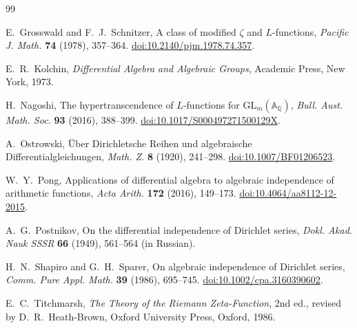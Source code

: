 \documentclass[11pt]{article}
\theoremstyle{definition}
\theoremstyle{remark}
\begin{document}
\begin{thebibliography}{99}

E.~Grosswald and F.~J.~Schnitzer,
\newblock A class of modified \(\zeta\) and \(L\)-functions,
\newblock \emph{Pacific J. Math.} \textbf{74} (1978), 357--364.
\newblock \href{https://doi.org/10.2140/pjm.1978.74.357}
{doi:10.2140/pjm.1978.74.357}.

E.~R.~Kolchin,
\newblock \emph{Differential Algebra and Algebraic Groups},
\newblock Academic Press, New York, 1973.

H.~Nagoshi,
\newblock The hypertranscendence of \(L\)-functions for
\(\mathrm{GL}_m(\mathbb A_{\mathbb Q})\),
\newblock \emph{Bull. Aust. Math. Soc.} \textbf{93} (2016), 388--399.
\newblock \href{https://doi.org/10.1017/S000497271500129X}
{doi:10.1017/S000497271500129X}.

A.~Ostrowski,
\newblock \"Uber Dirichletsche Reihen und algebraische Differentialgleichungen,
\newblock \emph{Math. Z.} \textbf{8} (1920), 241--298.
\newblock \href{https://doi.org/10.1007/BF01206523}
{doi:10.1007/BF01206523}.

W.~Y.~Pong,
\newblock Applications of differential algebra to algebraic independence of arithmetic
functions,
\newblock \emph{Acta Arith.} \textbf{172} (2016), 149--173.
\newblock \href{https://doi.org/10.4064/aa8112-12-2015}
{doi:10.4064/aa8112-12-2015}.

A.~G.~Postnikov,
\newblock On the differential independence of Dirichlet series,
\newblock \emph{Dokl. Akad. Nauk SSSR} \textbf{66} (1949), 561--564
\newblock (in Russian).

H.~N.~Shapiro and G.~H.~Sparer,
\newblock On algebraic independence of Dirichlet series,
\newblock \emph{Comm. Pure Appl. Math.} \textbf{39} (1986), 695--745.
\newblock \href{https://doi.org/10.1002/cpa.3160390602}
{doi:10.1002/cpa.3160390602}.

E.~C.~Titchmarsh,
\newblock \emph{The Theory of the Riemann Zeta-Function}, 2nd ed.,
revised by D.~R.~Heath-Brown,
\newblock Oxford University Press, Oxford, 1986.

\end{thebibliography}
\end{document}
